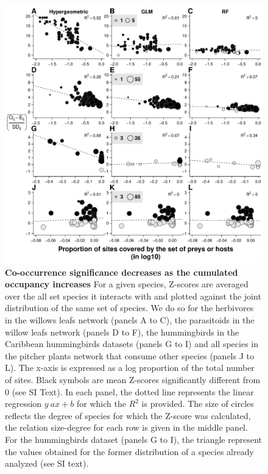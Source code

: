 \newpage

\begin{figure}[htbp]
\centering
\includegraphics{chapitre3/figdegocc.pdf}
\caption{\textbf{Co-occurrence significance decreases as the cumulated
occupancy increases} For a given species, Z-scores are averaged over the
all set species it interacts with and plotted against the joint
distribution of the same set of species. We do so for the herbivores in
the willows leafs network (panels A to C), the parasitoids in the willow
leafs network (panels D to F), the hummingbirds in the Caribbean
hummingbirds datasets (panels G to I) and all species in the pitcher
plants network that consume other species (panels J to L). The x-axis is
expressed as a log proportion of the total number of sites. Black
symbols are mean Z-scores significantly different from 0 (see SI Text).
In each panel, the dotted line represents the linear regression
\(y~ax+b\) for which the \(R^2\) is provided. The size of circles
reflects the degree of species for which the Z-score was calculated, the
relation size-degree for each row is given in the middle panel. For the
hummingbirds dataset (panels G to I), the triangle represent the values
obtained for the former distribution of a species already analyzed (see
SI text).\label{fig:degocc}}
\end{figure}

